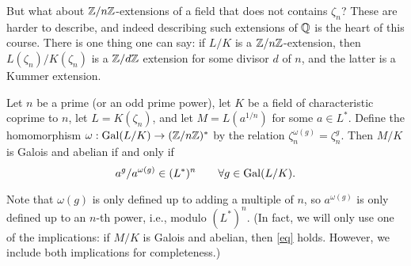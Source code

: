 But what about $\mathbb{Z}/n\mathbb{Z}$-extensions of a field that does not contains
$\zeta_{n}$? These are harder to describe, and indeed describing such 
extensions of $\mathbb{Q}$ is the heart of this course. There is one thing
one can say: if $L/K$ is a $\mathbb{Z}/n\mathbb{Z}$-extension, then $L(\zeta_n)/K(\zeta_n)$ is a $\mathbb{Z}/d\mathbb{Z}$ extension for some divisor $d$ of $n$, and
the latter is a Kummer extension.
\begin{lemma} \label{L:Kummer Galois criterion}
Let $n$ be a prime (or an odd prime power),
let $K$ be a field of characteristic coprime to $n$, let $L = K(\zeta_n)$,
and let $M = L(a^{1/n})$ for some $a \in L^*$. Define the homomorphism
$\omega: \operatorname{Gal}(L/K) \to (\mathbb{Z}/n\mathbb{Z})^*$ by the relation
$\zeta_n^{\omega(g)} = \zeta_n^g$. Then $M/K$ is Galois and
abelian if and only if
\begin{equation} \label{eq}
a^g / a^{\omega(g)} \in (L^*)^n \qquad \forall g \in \operatorname{Gal}(L/K).
\end{equation}
\end{lemma}
Note that $\omega(g)$ is only defined up to adding a multiple of $n$,
so $a^{\omega(g)}$ is only defined up to an $n$-th power, i.e., modulo
$(L^*)^n$. (In fact, we will only use one of the implications: if $M/K$ is Galois and abelian, then \eqref{eq} holds. However, we include both implications for completeness.)


